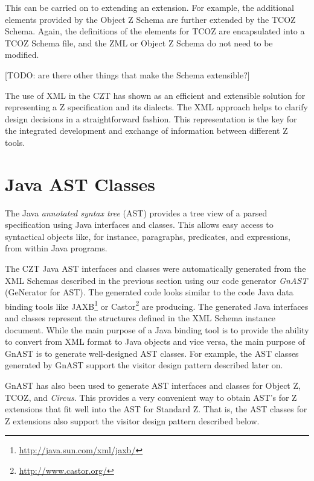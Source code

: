 \documentclass{llncs}
\newcommand{\Circus}{{\sf\slshape Circus}}
\begin{document}
  This can be carried on to extending an extension.  For example, the
  additional elements provided by the Object Z Schema are further
  extended by the TCOZ Schema.  Again, the definitions of the elements
  for TCOZ are encapsulated into a TCOZ Schema file, and the ZML or
  Object Z Schema do not need to be modified.

  [TODO: are there other things that make the Schema extensible?]

  The use of XML in the CZT has shown as an efficient and extensible
  solution for representing a Z specification and its dialects.  The
  XML approach helps to clarify design decisions in a straightforward
  fashion.  This representation is the key for the integrated
  development and exchange of information between different Z tools.

 \section{Java AST Classes}

  The Java \emph{annotated syntax tree} (AST) provides a tree view of
  a parsed specification using Java interfaces and classes.  This
  allows easy access to syntactical objects like, for instance,
  paragraphs, predicates, and expressions, from within Java programs.

  The CZT Java AST interfaces and classes were automatically generated
  from the XML Schemas described in the previous section using our
  code generator \emph{GnAST} (GeNerator for AST).  The generated code
  looks similar to the code Java data binding tools like
  JAXB\footnote{\url{http://java.sun.com/xml/jaxb/}} or
  Castor\footnote{\url{http://www.castor.org/}} are producing.  The
  generated Java interfaces and classes represent the structures
  defined in the XML Schema instance document.  While the main purpose
  of a Java binding tool is to provide the ability to convert from XML
  format to Java objects and vice versa, the main purpose of GnAST is
  to generate well-designed AST classes.  For example, the AST classes
  generated by GnAST support the visitor design pattern described
  later on.

  GnAST has also been used to generate AST interfaces and classes for
  Object Z, TCOZ, and \Circus.  This provides a very convenient way to
  obtain AST's for Z extensions that fit well into the AST for
  Standard Z.  That is, the AST classes for Z extensions also support
  the visitor design pattern described below.
\end{document}
